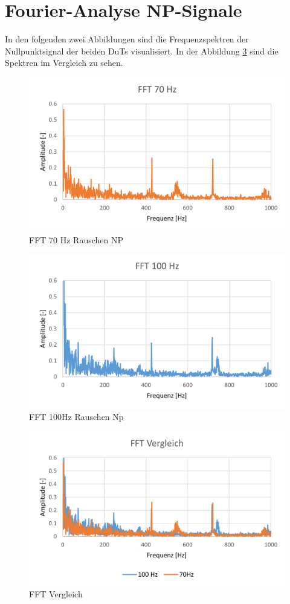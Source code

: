\section{Fourier-Analyse NP-Signale}
In den folgenden zwei Abbildungen sind die Frequenzspektren der Nullpunktsignal der beiden DuTs visualisiert. In der Abbildung \ref{fig:fftvergleich} sind die Spektren im Vergleich zu sehen.
\begin{figure}[H]
	\centering
	\includegraphics[width=1\linewidth]{imgs/FFT_70Hz}
	\caption{FFT 70 Hz Rauschen NP}
	\label{fig:fft70hz}
\end{figure}
\begin{figure}[H]
	\centering
	\includegraphics[width=1\linewidth]{imgs/FFT_100Hz}
	\caption{FFT 100Hz Rauschen Np}
	\label{fig:fft100hz}
\end{figure}
\begin{figure}[H]
	\centering
	\includegraphics[width=1\linewidth]{imgs/FFT_Vergleich}
	\caption{FFT Vergleich}
	\label{fig:fftvergleich}
\end{figure}
